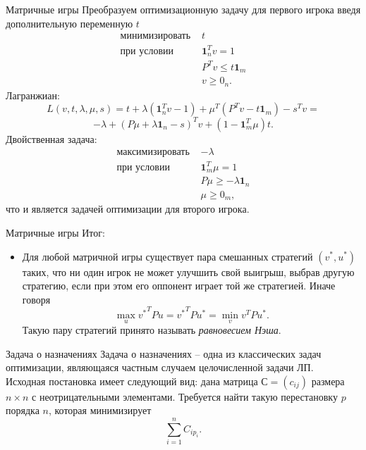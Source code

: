 \documentclass[10pt]{beamer}
\begin{document}
\begin{frame}{Матричные игры}
Преобразуем оптимизационную задачу для первого игрока введя дополнительную переменную $t$
$$
\begin{array}{ll}
\mbox{минимизировать } & t \\
\mbox{при условии }    & \mathbf{1}^T_nv=1 \\
 & P^Tv\leq t\mathbf{1}_m \\
 & v\geq 0_n.
\end{array}
$$
Лагранжиан:
$$
L(v, t, \lambda, \mu, s)=t+\lambda(\mathbf{1}^T_nv-1)+\mu^T(P^Tv-t\mathbf{1}_m)-s^Tv=
$$
$$
-\lambda+(P\mu+\lambda\mathbf{1}_n-s)^Tv+(1-\mathbf{1}^T_m\mu)t.
$$
Двойственная задача:
$$
\begin{array}{ll}
\mbox{максимизировать } & -\lambda \\
\mbox{при условии }    & \mathbf{1}^T_m\mu=1 \\
 & P\mu\geq -\lambda\mathbf{1}_n \\
 & \mu\geq 0_m,
\end{array}
$$
что и является задачей оптимизации для второго игрока.
\end{frame}

\begin{frame}{Матричные игры}
Итог:\\
\begin{itemize}
\item Для любой матричной игры существует пара смешанных стратегий $(v^*, u^*)$ таких, что ни один игрок не может улучшить свой выигрыш, выбрав другую стратегию, если при этом его оппонент играет той же стратегией. Иначе говоря
$$
\max_u {v^*}^TPu={v^*}^TPu^*=\min_v v^TPu^*.
$$
Такую пару стратегий принято называть \textit{равновесием Нэша}.
\end{itemize}
\end{frame}


\begin{frame}{Задача о назначениях}
Задача о назначениях -- одна из классических задач оптимизации, являющаяся частным случаем целочисленной задачи ЛП.\\
Исходная постановка имеет следующий вид: дана матрица $С=(c_{ij})$ размера $n\times n$ с неотрицательными элементами. Требуется найти такую перестановку $p$ порядка $n$, которая минимизирует 
$$
\sum_{i=1}^nC_{ip_i}.
$$
\end{frame}
\end{document}
